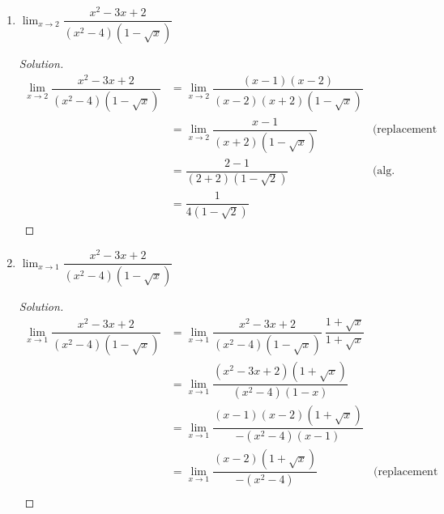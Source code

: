 \documentclass[12pt]{article}
\newenvironment{solution}{\begin{proof}[Solution]}{\end{proof}}
\begin{document}
\begin{enumerate}
\begin{enumerate}
			\begin{solution}				
				\begin{align*}
					\displaystyle{\lim_{x \to 1} \dfrac{x-1}{x-x^{-1}}}&=
					\displaystyle{\lim_{x \to 1} \dfrac{x-1}{x-\dfrac{1}{x}}}\\
					&=\displaystyle{\lim_{x \to 1} \dfrac{x-1}{\dfrac{x^2-1}{x}}}\\
					&=\displaystyle{\lim_{x \to 1} \dfrac{x(x-1)}{x^2-1}}\\	
					&=\displaystyle{\lim_{x \to 1} \dfrac{x(x-1)}{(x-1)(x+1)}}\\
					&= \displaystyle{\lim_{x \to 1} \dfrac{x}{x+1}} & \text{(replacement rule)}\\
					&= \dfrac{1}{1+1} &\text{(alg. function eval.)}\\
					&=\dfrac{1}{2}
				\end{align*}
			\end{solution}
			\item $\displaystyle{\lim_{x \to 2} \dfrac{x^2-3x+2}{(x^2-4)(1-\sqrt{x})}}$
			\begin{solution}
				\begin{align*} 
					\displaystyle{\lim_{x \to 2} \dfrac{x^2-3x+2}{(x^2-4)(1-\sqrt{x})}}
					&= \displaystyle{\lim_{x \to 2} \dfrac{(x-1)(x-2)}{(x-2)(x+2)(1-\sqrt{x})}}\\
					&= \displaystyle{\lim_{x \to 2} \dfrac{x-1}{(x+2)(1-\sqrt{x})}} & \text{(replacement rule)}\\
					&= \dfrac{2-1}{(2+2)(1-\sqrt{2})} & \text{(alg. function eval.)}\\
					&= \dfrac{1}{4(1-\sqrt{2})}
				\end{align*}
			\end{solution}
			\item $\displaystyle{\lim_{x \to 1} \dfrac{x^2-3x+2}{(x^2-4)(1-\sqrt{x})}}$
			\begin{solution}
				\begin{align*}
					\displaystyle{\lim_{x \to 1} \dfrac{x^2-3x+2}{(x^2-4)(1-\sqrt{x})}}
					&= \displaystyle{\lim_{x \to 1} \dfrac{x^2-3x+2}{(x^2-4)(1-\sqrt{x})}} \  \dfrac{1+\sqrt{x}}{1+\sqrt{x}}\\
					&= \displaystyle{\lim_{x \to 1} \dfrac{(x^2-3x+2)(1+\sqrt{x})}{(x^2-4)(1-x)}}\\
					&= \displaystyle{\lim_{x \to 1} \dfrac{(x-1)(x-2)(1+\sqrt{x})}{-(x^2-4)(x-1)}}\\
					&= \displaystyle{\lim_{x \to 1} \dfrac{(x-2)(1+\sqrt{x})}{-(x^2-4)}} & \text{(replacement rule)}\\

\end{align*}
\end{solution}
\end{enumerate}
\end{enumerate}
\end{document}
